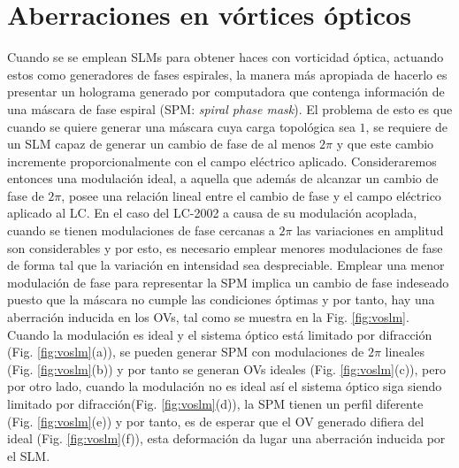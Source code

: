 \section{Aberraciones en vórtices ópticos}
\label{sec:genvoslm}


Cuando se se emplean SLMs para obtener haces con vorticidad óptica, actuando estos como generadores de fases espirales, la manera más apropiada de hacerlo es presentar un holograma generado por computadora que contenga información de una máscara de fase espiral (SPM: \textit{spiral phase mask}). El problema de esto es que cuando se quiere generar una máscara cuya carga topológica sea $1$, se requiere de un SLM capaz de generar un cambio de fase de al menos $2\pi$ y que este cambio incremente proporcionalmente con el campo eléctrico aplicado. Consideraremos entonces una modulación ideal, a aquella que además de alcanzar un cambio de fase de $2\pi$, posee una relación lineal entre el cambio de fase y el campo eléctrico aplicado al LC. En el caso del LC-2002 a causa de su modulación acoplada, cuando se tienen modulaciones de fase cercanas a $2\pi$ las variaciones en amplitud son considerables y por esto, es necesario emplear menores modulaciones de fase de forma tal que la variación en intensidad sea despreciable. Emplear una menor modulación de fase para representar la SPM implica un cambio de fase indeseado puesto que la máscara no cumple las condiciones óptimas y por tanto, hay una aberración inducida en los OVs, tal como se muestra en la Fig. \ref{fig:voslm}. Cuando la modulación es ideal y el sistema óptico está limitado por difracción (Fig. \ref{fig:voslm}(a)), se pueden generar SPM con modulaciones de $2\pi$ lineales (Fig. \ref{fig:voslm}(b)) y por tanto se generan OVs ideales (Fig. \ref{fig:voslm}(c)), pero por otro lado, cuando la modulación no es ideal así el sistema óptico siga siendo limitado por difracción(Fig. \ref{fig:voslm}(d)), la SPM tienen un perfil diferente (Fig. \ref{fig:voslm}(e)) y por tanto, es de esperar que el OV generado difiera del ideal (Fig. \ref{fig:voslm}(f)), esta deformación da lugar una aberración inducida por el SLM.\\


